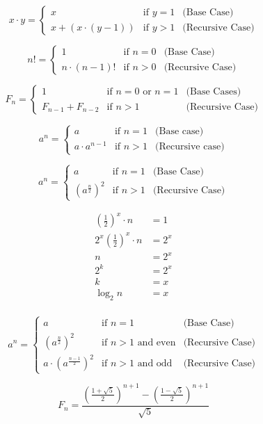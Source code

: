 \documentclass[12pt]{article}
\begin{document}
$$
x \cdot y =
\left\{\begin{array}{lll}
x & \text{if  $y = 1$} & \text{(Base Case)} \\
x + \left(x \cdot (y - 1)\right) & \text{if $y > 1$} & \text{(Recursive Case)}
\end{array}\right.
$$

$$
n! =
\left\{\begin{array}{lll}
1 & \text{if  $n = 0$} & \text{(Base Case)} \\
n \cdot (n-1)! & \text{if $n>0$} & \text{(Recursive Case)}
\end{array}\right.
$$

$$
F_n =
\left\{\begin{array}{lll}
1 & \text{if  $n=0$ or  $n = 1$} & \text{(Base Cases)} \\
F_{n-1}+F_{n-2} & \text{if $n>1$} & \text{(Recursive Case)}
\end{array}\right.
$$

$$
a^n =
\left\{\begin{array}{lll}
a & \text{if $n=1$} & \text{(Base case)} \\
a \cdot a^{n - 1} & \text{if $n>1$} & \text{(Recursive case)}
\end{array}\right.
$$

$$
a^n =
\left\{\begin{array}{lll}
a & \text{if  $n=1$} & \text{(Base Case)} \\
\left(a^{\frac{n}{2}}\right)^2 & \text{if  $n>1$} & \text{(Recursive Case)}
\end{array}\right.
$$

$$
\begin{aligned}
\left(\frac{1}{2}\right)^x \cdot n &= 1\\
2^x\left(\frac{1}{2}\right)^x \cdot n &= 2^x\\
n &= 2^x\\
2^k &= 2^x\\
k &= x\\
\log_2 n &= x\\
\end{aligned}
$$

$$
a^n =
\left\{\begin{array}{lll}
a & \text{if  $n=1$} & \text{(Base Case)} \\
\left(a^{\frac{n}{2}}\right)^2 & \text{if  $n>1$ and even} & \text{(Recursive Case)} \\
a\cdot \left(a^{\frac{n - 1}{2}}\right)^2 & \text{if  $n>1$ and odd} & \text{(Recursive Case)}
\end{array}\right.
$$

$$
F_n = \frac{\left(\frac{1 + \sqrt{5}}{2}\right)^{n+1}  -  \left(\frac{1 -
\sqrt{5}}{2}\right)^{n+1}}{\sqrt{5}}
$$
\end{document}

